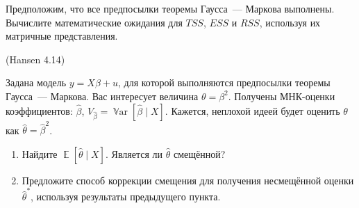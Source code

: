 \documentclass[12pt]{article}
\DeclareMathOperator{\Var}{\mathbb{V}ar}
\DeclareMathOperator{\E}{\mathbb{E}}
\newcommand{\hb}{\hat{\beta}}
\newcommand{\RSS}{RSS}
\newcommand{\ESS}{ESS}
\newcommand{\TSS}{TSS}
\newenvironment{sol}{}{}
\begin{document}
\begin{problem}
Предположим, что все предпосылки теоремы Гаусса~— Маркова выполнены. 
Вычислите математические ожидания для $\TSS$, $\ESS$ и $\RSS$, используя их матричные представления.
\begin{sol}
\end{sol}
\end{problem}

\begin{problem}(Hansen 4.14)

Задана модель $y = X \beta + u$, для которой выполняются предпосылки теоремы Гаусса~— Маркова. 
Вас интересует величина $\theta = \beta^2$. 
Получены МНК-оценки коэффициентов: $\hb$, $V_{\hb} = \Var [\hb \mid X]$. 
Кажется, неплохой идеей будет оценить $\theta$ как $\hat{\theta} = \hb^2$.

\begin{enumerate}
    \item Найдите $\E [\hat{\theta} \mid X]$. Является ли $\hat{\theta}$ смещённой?
    \item Предложите способ коррекции смещения для получения несмещённой оценки  $\hat{\theta}^*$, используя результаты предыдущего пункта.
\end{enumerate}

\begin{sol}
\end{sol}

\end{problem}
\end{document}
